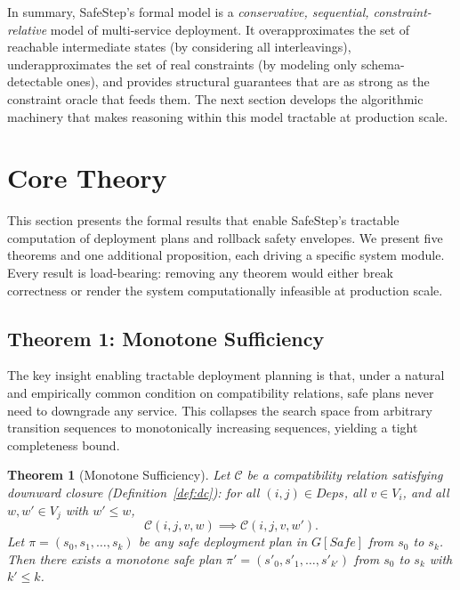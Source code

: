 \documentclass[10pt,twocolumn]{article}
\newtheorem{theorem}{Theorem}[section]
\begin{document}
\medskip
\noindent
In summary, SafeStep's formal model is a \emph{conservative, sequential,
constraint-relative} model of multi-service deployment.  It
overapproximates the set of reachable intermediate states (by considering
all interleavings), underapproximates the set of real constraints (by
modeling only schema-detectable ones), and provides structural guarantees
that are as strong as the constraint oracle that feeds them.  The next
section develops the algorithmic machinery that makes reasoning within this
model tractable at production scale.

\section{Core Theory}
\label{sec:theory}

This section presents the formal results that enable SafeStep's tractable computation of deployment plans and rollback safety envelopes. We present five theorems and one additional proposition, each driving a specific system module. Every result is load-bearing: removing any theorem would either break correctness or render the system computationally infeasible at production scale.

\subsection{Theorem 1: Monotone Sufficiency}
\label{sec:monotone}

The key insight enabling tractable deployment planning is that, under a natural and empirically common condition on compatibility relations, safe plans never need to downgrade any service. This collapses the search space from arbitrary transition sequences to monotonically increasing sequences, yielding a tight completeness bound.

\begin{theorem}[Monotone Sufficiency]
\label{thm:monotone}
Let $\mathcal{C}$ be a compatibility relation satisfying downward closure (Definition~\ref{def:dc}): for all $(i,j) \in \mathit{Deps}$, all $v \in V_i$, and all $w, w' \in V_j$ with $w' \leq w$,
\[
  \mathcal{C}(i,j,v,w) \implies \mathcal{C}(i,j,v,w').
\]
Let $\pi = (s_0, s_1, \ldots, s_k)$ be any safe deployment plan in $G[\mathit{Safe}]$ from $s_0$ to $s_k$. Then there exists a \emph{monotone} safe plan $\pi' = (s'_0, s'_1, \ldots, s'_{k'})$ from $s_0$ to $s_k$ with $k' \leq k$.
\end{theorem}
\end{document}
